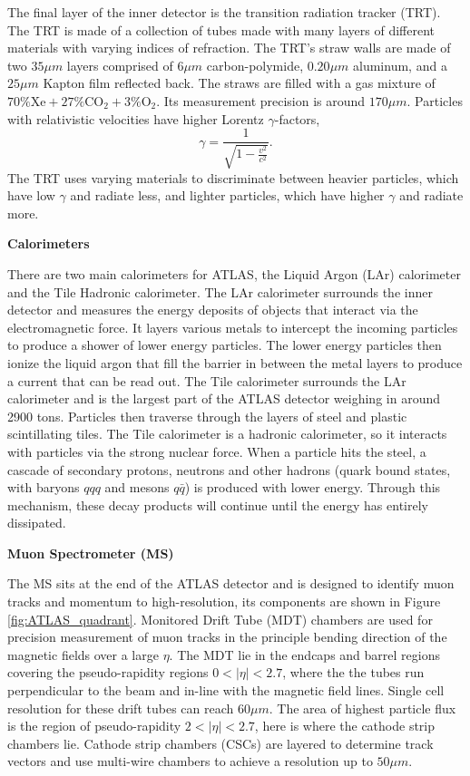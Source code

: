 The final layer of the inner detector is the transition radiation tracker (TRT). 
The TRT is made of a collection of tubes made with many layers of different materials with varying indices of refraction.
The TRT's straw walls are made of two $35\mu m$ layers comprised of $6\mu m$ carbon-polymide, $0.20 \mu m$ aluminum, and a $25\mu m$ Kapton film reflected back.\cite{TRT_2008}
The straws are filled with a gas mixture of $70\% \text{Xe} + 27\% \text{CO}_2 + 3\% \text{O}_2$. 
Its measurement precision is around $170 \mu m$. 
Particles with relativistic velocities have higher Lorentz $\gamma$-factors,
\begin{equation}\label{lorentzGamma}
    \gamma = \frac{1}{\sqrt{1 - \frac{v^2}{c^2}}}.
\end{equation}
The TRT uses varying materials to discriminate between heavier particles, which have low $\gamma$ and radiate less, and lighter particles, which have higher $\gamma$ and radiate more.\cite{Mindur:2139567}

\noindent\textbf{Calorimeters}

There are two main calorimeters for ATLAS, the Liquid Argon (LAr) calorimeter and the Tile Hadronic calorimeter.
The LAr calorimeter surrounds the inner detector and measures the energy deposits of objects that interact via the electromagnetic force. 
It layers various metals to intercept the incoming particles to produce a shower of lower energy particles. 
The lower energy particles then ionize the liquid argon that fill the barrier in between the metal layers to produce a current that can be read out.
The Tile calorimeter surrounds the LAr calorimeter and is the largest part of the ATLAS detector weighing in around 2900 tons. 
Particles then traverse through the layers of steel and plastic scintillating tiles. 
The Tile calorimeter is a hadronic calorimeter, so it interacts with particles via the strong nuclear force. 
When a particle hits the steel, a cascade of secondary protons, neutrons and other hadrons (quark bound states, with baryons $qqq$ and mesons $q\bar{q}$) is produced with lower energy. 
Through this mechanism, these decay products will continue until the energy has entirely dissipated.

\noindent\textbf{Muon Spectrometer (MS)}

The MS sits at the end of the ATLAS detector and is designed to identify muon tracks and momentum to high-resolution, its components are shown in Figure \ref{fig:ATLAS_quadrant}.
Monitored Drift Tube (MDT) chambers are used for precision measurement of muon tracks in the principle bending direction of the magnetic fields over a large $\eta$.
The MDT lie in the endcaps and barrel regions covering the pseudo-rapidity regions $0 < |\eta| < 2.7$, where the the tubes run perpendicular to the beam and in-line with the magnetic field lines.
Single cell resolution for these drift tubes can reach $60 \mu m$.\cite{ATLAS_Tech_Proposal}
The area of highest particle flux is the region of pseudo-rapidity $2 < |\eta| < 2.7$, here is where the cathode strip chambers lie.\cite{muonSpec}
Cathode strip chambers (CSCs) are layered to determine track vectors and use multi-wire chambers to achieve a resolution up to $50 \mu m$. 

